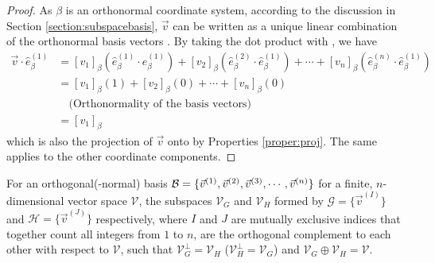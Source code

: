 \begin{proof}
As $\beta$ is an orthonormal coordinate system, according to the discussion in Section \ref{section:subspacebasis}, $\vec{v}$ can be written as a unique linear combination of the orthonormal basis vectors . By taking the dot product with , we have
\begin{align*}
\vec{v} \cdot \hat{e}_\beta^{(1)} &= [v_1]_\beta (\hat{e}_\beta^{(1)} \cdot \hat{e}_\beta^{(1)}) + [v_2]_\beta (\hat{e}_\beta^{(2)} \cdot \hat{e}_\beta^{(1)}) + \cdots + [v_n]_\beta (\hat{e}_\beta^{(n)} \cdot \hat{e}_\beta^{(1)}) \\
&= [v_1]_\beta (1) + [v_2]_\beta (0) + \cdots + [v_n]_\beta (0) \\
&\quad \text{(Orthonormality of the basis vectors)} \\
&= [v_1]_\beta
\end{align*}
which is also the projection of $\vec{v}$ onto  by Properties \ref{proper:proj}. The same applies to the other coordinate components.
\end{proof}
\begin{proper}
\label{proper:orthodirectsum}
For an orthogonal(-normal) basis $\mathcal{B} = \{\vec{v}^{(1)}, \vec{v}^{(2)}, \vec{v}^{(3)}, \cdots, \\ \vec{v}^{(n)}\}$ for a finite, $n$-dimensional vector space $\mathcal{V}$, the subspaces $\mathcal{V}_G$ and $\mathcal{V}_H$ formed by $\mathcal{G} = \{\vec{v}^{(I)}\}$ and $\mathcal{H} = \{\vec{v}^{(J)}\}$ respectively, where $I$ and $J$ are mutually exclusive indices that together count all integers from $1$ to $n$, are the orthogonal complement to each other with respect to $\mathcal{V}$, such that $\mathcal{V}_G^\perp = \mathcal{V}_H$ ($\mathcal{V}_H^\perp = \mathcal{V}_G$) and $\mathcal{V}_G \oplus \mathcal{V}_H = \mathcal{V}$.
\end{proper}


